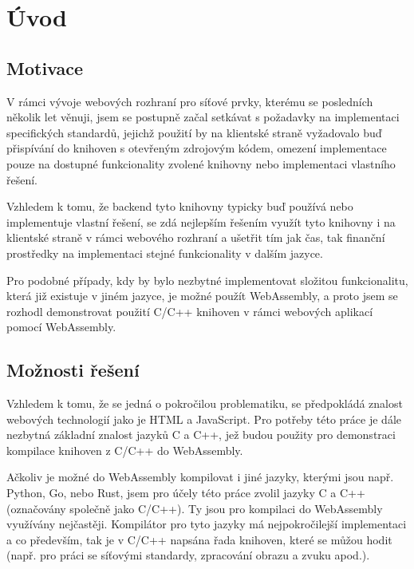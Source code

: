 \documentclass{{template/ctuthesis}}
\begin{document}
\maketitle

\chapter{Úvod}
\section{Motivace}

V rámci vývoje webových rozhraní pro síťové prvky, kterému se posledních několik let věnuji, jsem se postupně začal setkávat s požadavky na implementaci specifických standardů, jejichž použití by na klientské straně vyžadovalo buď přispívání do knihoven s otevřeným zdrojovým kódem, omezení implementace pouze na dostupné funkcionality zvolené knihovny nebo implementaci vlastního řešení.

Vzhledem k tomu, že backend tyto knihovny typicky buď používá nebo implementuje vlastní řešení, se zdá nejlepším řešením využít tyto knihovny i na klientské straně v rámci webového rozhraní a ušetřit tím jak čas, tak finanční prostředky na implementaci stejné funkcionality v dalším jazyce.


Pro podobné případy, kdy by bylo nezbytné implementovat složitou funkcionalitu, která již existuje v jiném jazyce, je možné použít WebAssembly, a proto jsem se rozhodl demonstrovat použití C/C++ knihoven v rámci webových aplikací pomocí WebAssembly.


\section{Možnosti řešení}

Vzhledem k tomu, že se jedná o pokročilou problematiku, se předpokládá znalost webových technologií jako je HTML a JavaScript. Pro potřeby této práce je dále nezbytná základní znalost jazyků C a C++, jež budou použity pro demonstraci kompilace knihoven z C/C++ do WebAssembly.

Ačkoliv je možné do WebAssembly kompilovat i jiné jazyky, kterými jsou např. Python, Go, nebo Rust, jsem pro účely této práce zvolil jazyky C a C++ (označovány společně jako C/C++). Ty jsou pro kompilaci do WebAssembly využívány nejčastěji. Kompilátor pro tyto jazyky má nejpokročilejší implementaci a co především, tak je v C/C++ napsána řada knihoven, které se můžou hodit (např. pro práci se síťovými standardy, zpracování obrazu a zvuku apod.).
\end{document}
